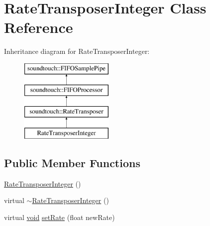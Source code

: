 \hypertarget{class_rate_transposer_integer}{}\section{Rate\+Transposer\+Integer Class Reference}
\label{class_rate_transposer_integer}
Inheritance diagram for Rate\+Transposer\+Integer\+:\begin{figure}[H]
\begin{center}
\leavevmode
\includegraphics[height=4.000000cm]{class_rate_transposer_integer}
\end{center}
\end{figure}
\subsection*{Public Member Functions}
\begin{DoxyCompactItemize}
\item 
\hyperlink{class_rate_transposer_integer_a87fab062476ad09ba1fa42ee965d812e}{Rate\+Transposer\+Integer} ()
\item 
virtual \hyperlink{class_rate_transposer_integer_ae6b983bfe87436ad11291d8aa489013c}{$\sim$\+Rate\+Transposer\+Integer} ()
\item 
virtual \hyperlink{sound_8c_ae35f5844602719cf66324f4de2a658b3}{void} \hyperlink{class_rate_transposer_integer_a7908cf5fa6d040a454feb074580d1890}{set\+Rate} (float new\+Rate)
\end{DoxyCompactItemize}
